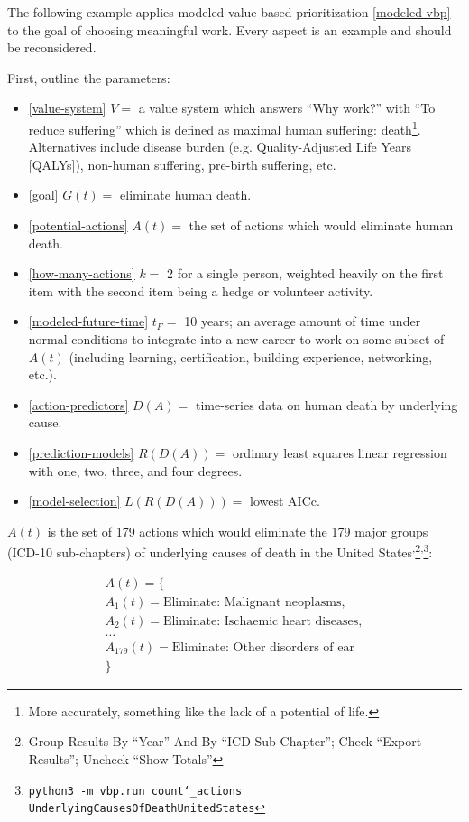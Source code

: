 \documentclass[12pt, a4paper, twocolumn]{article}
\begin{document}
The following example applies modeled value-based prioritization \eqref{modeled-vbp} to the goal of choosing meaningful work. Every aspect is an example and should be reconsidered.

First, outline the parameters:

\begin{itemize}
\item \eqref{value-system} $V = $ a value system which answers \enquote{Why work?} with \enquote{To reduce suffering} which is defined as maximal human suffering: death\footnote{More accurately, something like the lack of a potential of life.}. Alternatives include disease burden (e.g. Quality-Adjusted Life Years [QALYs]\cite{weinstein2009qalys}), non-human suffering, pre-birth suffering, etc.
\item \eqref{goal} $G(t) = $ eliminate human death.
\item \eqref{potential-actions} $A(t) = $ the set of actions which would eliminate human death.
\item \eqref{how-many-actions} $k = $ 2 for a single person, weighted heavily on the first item with the second item being a hedge or volunteer activity.
\item \eqref{modeled-future-time} $t_F = $ 10 years; an average amount of time under normal conditions to integrate into a new career to work on some subset of $A(t)$ (including learning, certification, building experience, networking, etc.).
\item \eqref{action-predictors} $D(A) = $ time-series data on human death by underlying cause.
\item \eqref{prediction-models} $R(D(A)) = $ ordinary least squares linear regression with one, two, three, and four degrees.
\item \eqref{model-selection} $L(R(D(A))) = $ lowest AICc.
\end{itemize}

$A(t)$ is the set of 179 actions which would eliminate the 179 major groups (ICD-10 sub-chapters\cite{icd10}) of underlying causes of death in the United States\cite{centers2017underlying}\textsuperscript{,}\footnote{Group Results By \enquote{Year} And By \enquote{ICD Sub-Chapter}; Check \enquote{Export Results}; Uncheck \enquote{Show Totals}}\textsuperscript{,}\footnote{\texttt{python3 -m vbp.run count\char`_actions UnderlyingCausesOfDeathUnitedStates}}:

\begin{equation*}
\begin{gathered}
A(t) = \{\\
A_1(t) = \textrm{Eliminate: Malignant neoplasms},\\
A_2(t) = \textrm{Eliminate: Ischaemic heart diseases},\\
\textrm{\ldots}\\
A_{179}(t) = \textrm{Eliminate: Other disorders of ear}\\
\}
\end{gathered}
\end{equation*}
\end{document}
